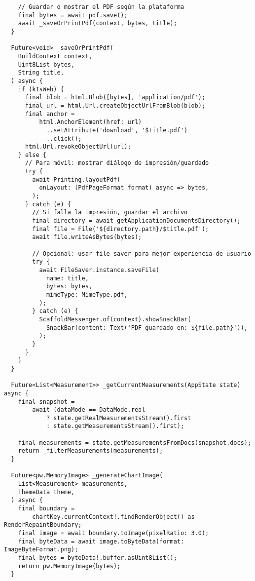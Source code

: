 \begin{verbatim}
    // Guardar o mostrar el PDF según la plataforma
    final bytes = await pdf.save();
    await _saveOrPrintPdf(context, bytes, title);
  }

  Future<void> _saveOrPrintPdf(
    BuildContext context,
    Uint8List bytes,
    String title,
  ) async {
    if (kIsWeb) {
      final blob = html.Blob([bytes], 'application/pdf');
      final url = html.Url.createObjectUrlFromBlob(blob);
      final anchor =
          html.AnchorElement(href: url)
            ..setAttribute('download', '$title.pdf')
            ..click();
      html.Url.revokeObjectUrl(url);
    } else {
      // Para móvil: mostrar diálogo de impresión/guardado
      try {
        await Printing.layoutPdf(
          onLayout: (PdfPageFormat format) async => bytes,
        );
      } catch (e) {
        // Si falla la impresión, guardar el archivo
        final directory = await getApplicationDocumentsDirectory();
        final file = File('${directory.path}/$title.pdf');
        await file.writeAsBytes(bytes);

        // Opcional: usar file_saver para mejor experiencia de usuario
        try {
          await FileSaver.instance.saveFile(
            name: title,
            bytes: bytes,
            mimeType: MimeType.pdf,
          );
        } catch (e) {
          ScaffoldMessenger.of(context).showSnackBar(
            SnackBar(content: Text('PDF guardado en: ${file.path}')),
          );
        }
      }
    }
  }

  Future<List<Measurement>> _getCurrentMeasurements(AppState state) async {
    final snapshot =
        await (dataMode == DataMode.real
            ? state.getRealMeasurementsStream().first
            : state.getMeasurementsStream().first);

    final measurements = state.getMeasurementsFromDocs(snapshot.docs);
    return _filterMeasurements(measurements);
  }

  Future<pw.MemoryImage> _generateChartImage(
    List<Measurement> measurements,
    ThemeData theme,
  ) async {
    final boundary =
        chartKey.currentContext!.findRenderObject() as RenderRepaintBoundary;
    final image = await boundary.toImage(pixelRatio: 3.0);
    final byteData = await image.toByteData(format: ImageByteFormat.png);
    final bytes = byteData!.buffer.asUint8List();
    return pw.MemoryImage(bytes);
  }


\end{verbatim}
